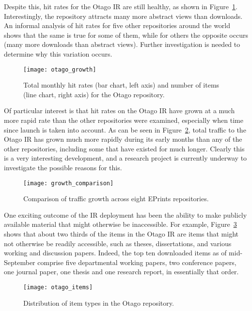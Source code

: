 \documentclass[12pt,pdftex,a4paper,titlepage]{article}
\begin{document}
Despite this, hit rates for the Otago IR are still healthy, as shown in Figure~\ref{fig-otago-growth}. Interestingly, the repository attracts many more abstract views than downloads. An informal analysis of hit rates for five other repositories around the world shows that the same is true for some of them, while for others the opposite occurs (many more downloads than abstract views). Further investigation is needed to determine why this variation occurs.


\begin{figure}
	\centering
	\texttt{[image: otago\_growth]}
	\caption{Total monthly hit rates (bar chart, left axis) and number of items (line chart, right axis) for the Otago repository.}
	\label{fig-otago-growth}
\end{figure}


Of particular interest is that hit rates on the Otago IR have grown at a much more rapid rate than the other repositories were examined, especially when time since launch is taken into account. As can be seen in Figure~\ref{fig-growth-comparison}, total traffic to the Otago IR has grown much more rapidly during its early months than any of the other repositories, including some that have existed for much longer. Clearly this is a very interesting development, and a research project is currently underway to investigate the possible reasons for this.


\begin{figure}
	\centering
	\texttt{[image: growth\_comparison]}
	\caption{Comparison of traffic growth across eight EPrints repositories.}
	\label{fig-growth-comparison}
\end{figure}


One exciting outcome of the IR deployment has been the ability to make publicly available material that might otherwise be inaccessible. For example, Figure~\ref{fig-item-types} shows that about two thirds of the items in the Otago IR are items that might not otherwise be readily accessible, such as theses, dissertations, and various working and discussion papers. Indeed, the top ten downloaded items as of mid-September comprise five departmental working papers, two conference papers, one journal paper, one thesis and one research report, in essentially that order.


\begin{figure}
	\centering
	\texttt{[image: otago\_items]}
	\caption{Distribution of item types in the Otago repository.}
	\label{fig-item-types}
\end{figure}
\end{document}

